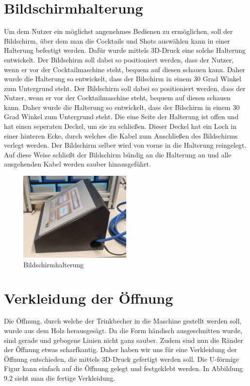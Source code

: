 \documentclass[10pt,a4paper]{report}
\begin{document}
	\section{Bildschirmhalterung}	
	Um dem Nutzer ein möglichst angenehmes Bedienen zu ermöglichen, soll der Bildschirm, über dem man die Cocktails und Shots auswählen kann in einer Halterung befestigt werden. Dafür wurde mittels 3D-Druck eine solche Halterung entwickelt. Der Bildschirm soll dabei so positioniert werden, dass der Nutzer, wenn er vor der Cocktailmaschine steht, bequem auf diesen schauen kann. Daher wurde die Halterung so entwickelt, dass der Bilschirm in einem 30 Grad Winkel zum Untergrund steht.
	Der Bildschirm soll dabei so positioniert werden, dass der Nutzer, wenn er vor der Cocktailmaschine steht, bequem auf diesen schauen kann. Daher wurde die Halterung so entwickelt, dass der Bilschirm in einem 30 Grad Winkel zum Untergrund steht. Die eine Seite der Halterung ist offen und hat einen seperaten Deckel, um sie zu schließen. Dieser Deckel hat ein Loch in einer hinteren Ecke, durch welches die Kabel zum Anschließen des Bildschirms verlegt werden. Der Bildschirm selber wird von vorne in die Halterung reingelegt. 
	Auf diese Weise schließt der Bildschirm bündig an die Halterung an und alle ausgehenden Kabel werden sauber hinausgeführt.\\
	\begin{figure}[htb]
		\includegraphics[width=0.5\textwidth]{Abb.2_Bildschirmhalterung_komplett}
		\centering
		\caption{Bildschirmhalterung}
	\end{figure}
	
	\section{Verkleidung der Öffnung}
	Die Öffnung, durch welche der Trinkbecher in die Maschine gestellt werden soll, wurde aus dem Holz herausgesägt. Da die Form händisch ausgeschnitten wurde, sind gerade und gebogene Linien nicht ganz sauber. Zudem sind nun die Ränder der Öffnung etwas scharfkantig. Daher haben wir uns für eine Verkleidung der Öffnung entschieden, die mittels 3D-Druck gefertigt werden soll. Die U-förmige Figur kann einfach auf die Öffnung gelegt und festgeklebt werden. In Abbildung 9.2 sieht man die fertige Verkleidung.
	
\end{document}
